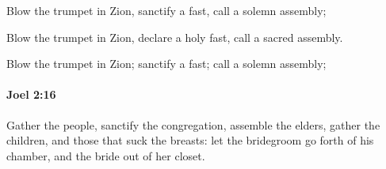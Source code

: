 			\begin{versebox}
					\item[BHS] 
					\item[LXX] 
					\item[ASV] Blow the trumpet in Zion, sanctify a fast, call a solemn assembly;
					\item[NIV] Blow the trumpet in Zion, declare a holy fast, call a sacred assembly.
					\item[NRSV] Blow the trumpet in Zion; sanctify a fast; call a solemn assembly;
			\end{versebox}

		\paragraph{Joel 2:16} %
			\label{JOEL-2-16}

			Gather the people, sanctify the congregation, assemble the elders, gather the children, and those that suck the breasts: let the bridegroom go forth of his chamber, and the bride out of her closet.

